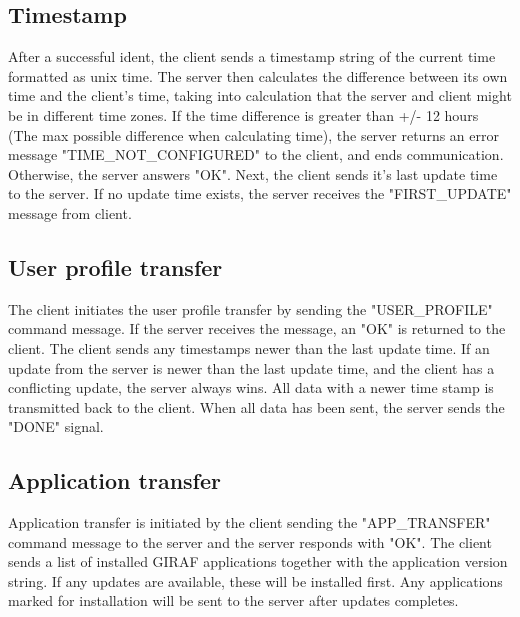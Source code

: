 \subsection{Timestamp}
After a successful ident, the client sends a timestamp string of the current time formatted as unix time. The server then calculates the difference between its own time and the client's time, taking into calculation that the server and client might be in different time zones. If the time difference is greater than +/- 12 hours (The max possible difference when calculating time), the server returns an error message "TIME\_NOT\_CONFIGURED" to the client, and ends communication. Otherwise, the server answers "OK". 
Next, the client sends it's last update time to the server. If no update time exists, the server receives the "FIRST\_UPDATE" message from client.

\subsection{User profile transfer}
The client initiates the user profile transfer  by sending the "USER\_PROFILE" command message. If the server receives the message, an "OK" is returned to the client. The client sends any timestamps newer than the last update time. If an update from the server is newer than the last update time, and the client has a conflicting update, the server always wins. All data with a newer time stamp is transmitted back to the client. When all data has been sent, the server sends the "DONE" signal. 

\subsection{Application transfer}
Application transfer is initiated by the client sending the "APP\_TRANSFER" command message to the server and the server responds with "OK". The client sends a list of installed GIRAF applications together with the application version string. If any updates are available, these will be installed first. Any applications marked for installation will be sent to the server after updates completes.   

